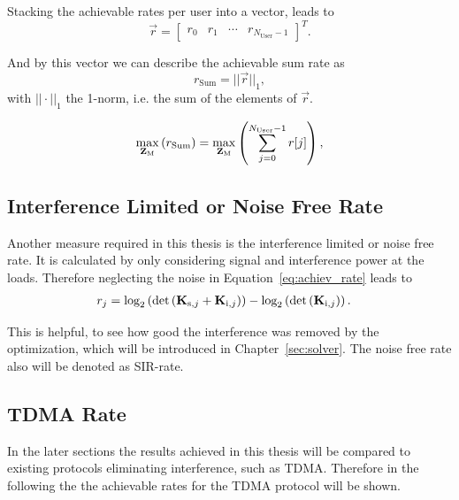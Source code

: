 Stacking the achievable rates per user into a vector, leads to 
\begin{equation}
\label{eq:achiev_vec}
\vec{r} =
\begin{bmatrix}
r_0 & r_1 & \cdots & r_{N_\text{User}-1}
\end{bmatrix}^T.
\end{equation}

And by this vector we can describe the achievable sum rate as
\begin{equation}
\label{eq:achiev_sum_rate}
r_\text{Sum} = ||\vec{r}||_1,
\end{equation}
with $||\cdot||_1$ the 1-norm, i.e. the sum of the elements of $\vec{r}$.

\begin{equation}
\label{eq:achiev_sum_rate}
\max_{\mathbf{Z}_\text{M}}\left(r_\text{Sum}\right) = \max_{\mathbf{Z}_\text{M}}\left(\sum_{j=0}^{N_\text{User}-1} r[j]\right),
\end{equation}

\subsection{Interference Limited or Noise Free Rate}
\label{sec:sir_rate}
Another measure required in this thesis is the interference limited or noise free rate.
It is calculated by only considering signal and interference power at the loads.
Therefore neglecting the noise in Equation~\ref{eq:achiev_rate} leads to
\begin{align}
\label{eq:sir_rate}
r_j &=\text{log}_2\left(\text{det}\left(\mathbf{K}_{\text{s},j}+\mathbf{K}_{\text{i},j}\right)\right) -
	     	\text{log}_2\left(\text{det}\left(\mathbf{K}_{\text{i},j}\right)\right).
\end{align}

This is helpful, to see how good the interference was removed by the optimization, which will be introduced in Chapter~\ref{sec:solver}.
The noise free rate also will be denoted as SIR-rate.


\subsection{TDMA Rate}
\label{sec:tdma_rate}
In the later sections the results achieved in this thesis will be compared to existing protocols eliminating interference, such as TDMA.
Therefore in the following the the achievable rates for the TDMA protocol will be shown.

